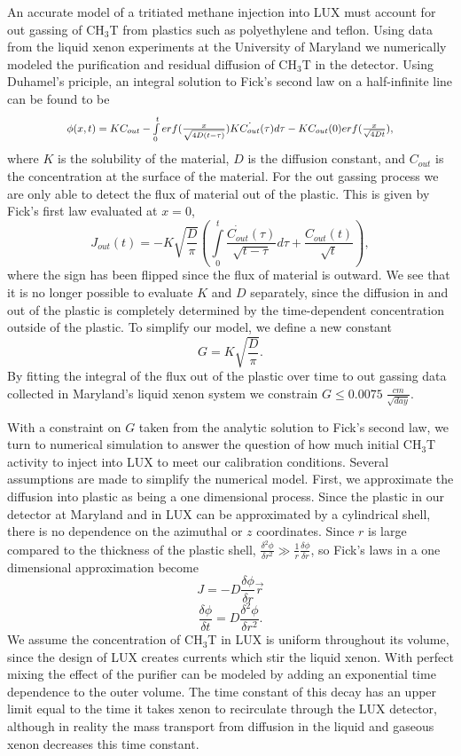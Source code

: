 \newcommand*{\Scale}[2][4]{\scalebox{#1}{$#2$}}%

An accurate model of a tritiated methane injection into LUX must account for out gassing of CH$_3$T from plastics such as polyethylene and teflon.  Using data from the liquid xenon experiments at the University of Maryland we numerically modeled the purification and residual diffusion of CH$_3$T in the detector.  Using Duhamel's priciple, an integral solution to Fick's second law on a half-infinite line can be found to be
\[\Scale[0.85]{\phi (x,t) = KC_{out} - \int \limits_0^t erf(\frac{x}{\sqrt{4D(t - \tau)}})K\dot{C_{out}}(\tau)d\tau - KC_{out}(0)erf(\frac{x}{\sqrt{4Dt}}),}\]
where $K$ is the solubility of the material, $D$ is the diffusion constant, and $C_{out}$ is the concentration at the surface of the material. 
For the out gassing process we are only able to detect the flux of material out of the plastic.  This is given by Fick's first law evaluated at $x=0$,
\[J_{out}(t)= - K \sqrt{\frac{D}{\pi}}\left( \int \limits_0^t \frac{\dot{C_{out}}(\tau)}{\sqrt{t-\tau}} d \tau + \frac{C_{out}(t)}{\sqrt{t}}\right),\]
where the sign has been flipped since the flux of material is outward.  We see that it is no longer possible to evaluate $K$ and $D$ separately, since the diffusion in and out of the plastic is completely determined by the time-dependent concentration outside of the plastic.  To simplify our model, we define a new constant
\[ G = K \sqrt{ \frac{D}{ \pi }} .\]
By fitting the integral of the flux out of the plastic over time to out gassing data collected in Maryland's liquid xenon system we constrain $G \leq 0.0075 \; \frac{cm}{\sqrt{day}}.$ 

With a constraint on $G$ taken from the analytic solution to Fick's second law, we turn to numerical simulation to answer the question of how much initial CH$_3$T activity to inject into LUX to meet our calibration conditions.  Several assumptions are made to simplify the numerical model.  First, we approximate the diffusion into plastic as being a one dimensional process.  Since the plastic in our detector at Maryland and in LUX can be approximated by a cylindrical shell, there is no dependence on the azimuthal or $z$ coordinates.  Since $r$ is large compared to the thickness of the plastic shell, $\frac{\delta^2 \phi}{\delta r^2} \gg \frac{1}{r} \frac {\delta \phi}{\delta r}$, so Fick's laws in a one dimensional approximation become
\[J=-D\frac{\delta \phi}{\delta r}\vec{r}\]
\[\frac{\delta \phi}{\delta t} = D \frac{\delta^2 \phi}{\delta r^2}.\]  We assume the concentration of CH$_3$T in LUX is uniform throughout its volume, since the design of LUX creates currents which stir the liquid xenon.  With perfect mixing the effect of the purifier can be modeled by adding an exponential time dependence to the outer volume.  The time constant of this decay has an upper limit equal to the time it takes xenon to recirculate through the LUX detector, although in reality the mass transport from diffusion in the liquid and gaseous xenon decreases this time constant. 

